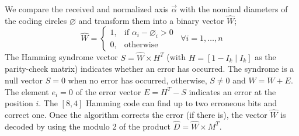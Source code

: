 We compare the received and normalized axis $\vec{\alpha}$ with the nominal diameters of the coding circles $\varnothing$ and transform them into a binary vector $\widehat{W}$;
\begin{equation}
\widehat{W}=
\begin{cases}
  1, & \text{if } \alpha_{i}-\diameter_{i} > 0 \\
  0, & \text{otherwise}
\end{cases} \enspace \forall i=1,\ldots, n
\end{equation}
The Hamming syndrome vector $S=\widehat{W}\times H^{T}$ (with $H=[1-I_{k}\mid I_{k}]$ as the parity-check matrix) indicates whether an error has occurred. The syndrome is a null vector $S=0$ when no error has occurred, otherwise, $S\neq 0$ and $\widehat{W}=W+E$. The element $e_{i}=0$ of the error vector $E=H^{T}-S$ indicates an error at the position $i$. The $[8,4]$ Hamming code can find up to two erroneous bits and correct one. Once the algorithm corrects the error (if there is), the vector $\widehat{W}$ is decoded by using the modulo 2 of the product $\widehat{D}=\widehat{W}\times M^{T}$. 

